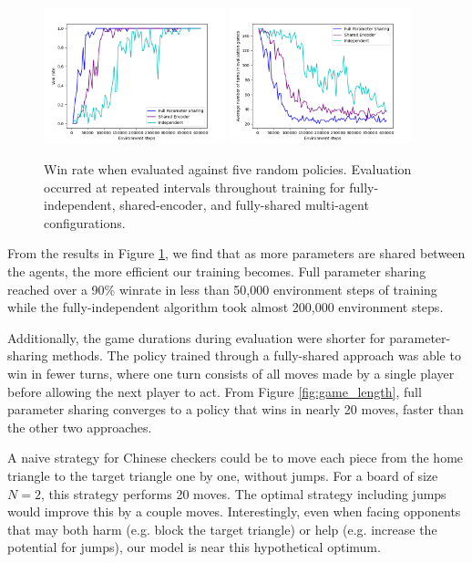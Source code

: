 \documentclass[12pt, a4paper, twocolumn]{article}
\begin{document}
\begin{figure}[ht]
  \centering
    \includegraphics[width=0.47\textwidth]{images/winrate.png}
    \includegraphics[width=0.47\textwidth]{images/game_length.png}
  \caption{Win rate when evaluated against five random policies. Evaluation occurred at repeated intervals throughout training for fully-independent, shared-encoder, and fully-shared multi-agent configurations.}\label{fig:winrate}
\end{figure}

From the results in Figure \ref{fig:winrate}, we find that as more parameters are shared between the agents, the more efficient our training becomes. Full parameter sharing reached over a 90\% winrate in less than 50,000 environment steps of training while the fully-independent algorithm took almost 200,000 environment steps.

Additionally, the game durations during evaluation were shorter for parameter-sharing methods. The policy trained through a fully-shared approach was able to win in fewer turns, where one turn consists of all moves made by a single player before allowing the next player to act. From Figure \ref{fig:game_length}, full parameter sharing converges to a policy that wins in nearly 20 moves, faster than the other two approaches.

A naive strategy for Chinese checkers could be to move each piece from the home triangle to the target triangle one by one, without jumps. For a board of size $N = 2$, this strategy performs 20 moves. The optimal strategy including jumps would improve this by a couple moves. Interestingly, even when facing opponents that may both harm (e.g. block the target triangle) or help (e.g. increase the potential for jumps), our model is near this hypothetical optimum.
\end{document}
